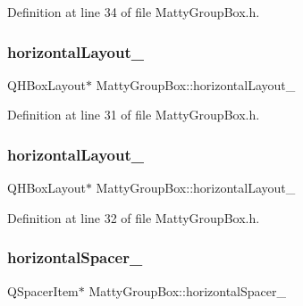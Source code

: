 Definition at line 34 of file Matty\+Group\+Box.\+h.

\hypertarget{classMattyGroupBox_a5d52dd2e01ba1a5d155e056ea438f142}{}\label{classMattyGroupBox_a5d52dd2e01ba1a5d155e056ea438f142} 
\subsubsection{\texorpdfstring{horizontal\+Layout\+\_}{horizontalLayout\_1}}
{\footnotesize\ttfamily Q\+H\+Box\+Layout$\ast$ Matty\+Group\+Box\+::horizontal\+Layout\+\_\hspace{0.3cm}{\ttfamily [private]}}



Definition at line 31 of file Matty\+Group\+Box.\+h.

\hypertarget{classMattyGroupBox_a053f7794bcd10214414d41e9c09663e0}{}\label{classMattyGroupBox_a053f7794bcd10214414d41e9c09663e0} 
\subsubsection{\texorpdfstring{horizontal\+Layout\+\_}{horizontalLayout\_2}}
{\footnotesize\ttfamily Q\+H\+Box\+Layout$\ast$ Matty\+Group\+Box\+::horizontal\+Layout\+\_\hspace{0.3cm}{\ttfamily [private]}}



Definition at line 32 of file Matty\+Group\+Box.\+h.

\hypertarget{classMattyGroupBox_a6b2678b09a3c56c18f357775e83b76c0}{}\label{classMattyGroupBox_a6b2678b09a3c56c18f357775e83b76c0} 
\subsubsection{\texorpdfstring{horizontal\+Spacer\+\_}{horizontalSpacer\_1}}
{\footnotesize\ttfamily Q\+Spacer\+Item$\ast$ Matty\+Group\+Box\+::horizontal\+Spacer\+\_\hspace{0.3cm}{\ttfamily [private]}}



